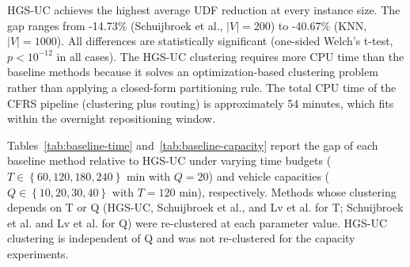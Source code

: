 HGS-UC achieves the highest average UDF reduction at every instance size. The gap ranges from -14.73\% (Schuijbroek et al., $\mid V\mid =200$) to -40.67\% (KNN, $\mid V\mid =1000$). All differences are statistically significant (one-sided Welch's t-test, $p<{{10}^{-12}}$ in all cases). The HGS-UC clustering requires more CPU time than the baseline methods because it solves an optimization-based clustering problem rather than applying a closed-form partitioning rule. The total CPU time of the CFRS pipeline (clustering plus routing) is approximately 54 minutes, which fits within the overnight repositioning window.

Tables~\ref{tab:baseline-time} and~\ref{tab:baseline-capacity} report the gap of each baseline method relative to HGS-UC under varying time budgets ($T\in \left\{ 60,120,180,240 \right\}$ min with $Q=20$) and vehicle capacities ($Q\in \left\{ 10,20,30,40 \right\}$ with $T=120$ min), respectively. Methods whose clustering depends on T or Q (HGS-UC, Schuijbroek et al., and Lv et al. for T; Schuijbroek et al. and Lv et al. for Q) were re-clustered at each parameter value. HGS-UC clustering is independent of Q and was not re-clustered for the capacity experiments.


